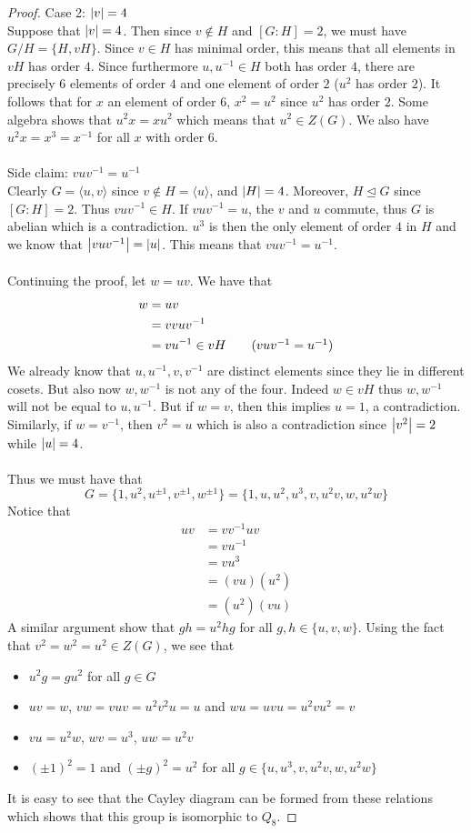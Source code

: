 \documentclass[a4paper]{article}
\begin{document}
\begin{thm}{}{}
\begin{proof}
Case 2: $\abs{v}=4$\\
Suppose that $\abs{v}=4$. Then since $v\notin H$ and $[G:H]=2$, we must have $G/H=\{H,vH\}$. Since $v\in H$ has minimal order, this means that all elements in $vH$ has order $4$. Since furthermore $u,u^{-1}\in H$ both has order $4$, there are precisely $6$ elements of order $4$ and one element of order $2$ ($u^2$ has order $2$). It follows that for $x$ an element of order $6$, $x^2=u^2$ since $u^2$ has order $2$. Some algebra shows that $u^2x=xu^2$ which means that $u^2\in Z(G)$. We also have $u^2x=x^3=x^{-1}$ for all $x$ with order $6$. \\~\\
Side claim: $vuv^{-1}=u^{-1}$\\
Clearly $G=\langle u,v\rangle $ since $v\notin H=\langle u\rangle$, and $\abs{H}=4$. Moreover, $H\trianglelefteq G$ since $[G:H]=2$. Thus $vuv^{-1}\in H$. If $vuv^{-1}=u$, the $v$ and $u$ commute, thus $G$ is abelian which is a contradiction. $u^3$ is then the only element of order $4$ in $H$ and we know that $\abs{vuv^{-1}}=\abs{u}$. This means that $vuv^{-1}=u^{-1}$. \\~\\
Continuing the proof, let $w=uv$. We have that 
\begin{align*}
w&=uv\\
&=vvuv^{-1}\\
&=vu^{-1}\in vH\tag{$vuv^{-1}=u^{-1}$}\\
\end{align*}
We already know that $u,u^{-1},v,v^{-1}$ are distinct elements since they lie in different cosets. But also now $w,w^{-1}$ is not any of the four. Indeed $w\in vH$ thus $w,w^{-1}$ will not be equal to $u,u^{-1}$. But if $w=v$, then this implies $u=1$, a contradiction. Similarly, if $w=v^{-1}$, then $v^2=u$ which is also a contradiction since $\abs{v^2}=2$ while $\abs{u}=4$. \\~\\
Thus we must have that $$G=\{1,u^2,u^{\pm 1}, v^{\pm 1}, w^{\pm 1}\}=\{1,u,u^2,u^3,v,u^2v,w,u^2w\}$$ Notice that 
\begin{align*}
uv&=vv^{-1}uv\\
&=vu^{-1}\\
&=vu^3\\
&=(vu)(u^2)\\
&=(u^2)(vu)
\end{align*}
A similar argument show that $gh=u^2hg$ for all $g,h\in\{u,v,w\}$. Using the fact that $v^2=w^2=u^2\in Z(G)$, we see that 
\begin{itemize}
\item $u^2g=gu^2$ for all $g\in G$
\item $uv=w$, $vw=vuv=u^2v^2u=u$ and $wu=uvu=u^2vu^2=v$
\item $vu=u^2w$, $wv=u^3$, $uw=u^2v$
\item $(\pm 1)^2=1$ and $(\pm g)^2=u^2$ for all $g\in\{u,u^3,v,u^2v,w,u^2w\}$
\end{itemize}
It is easy to see that the Cayley diagram can be formed from these relations which shows that this group is isomorphic to $Q_8$. 
\end{proof}
\end{thm}
\end{document}
